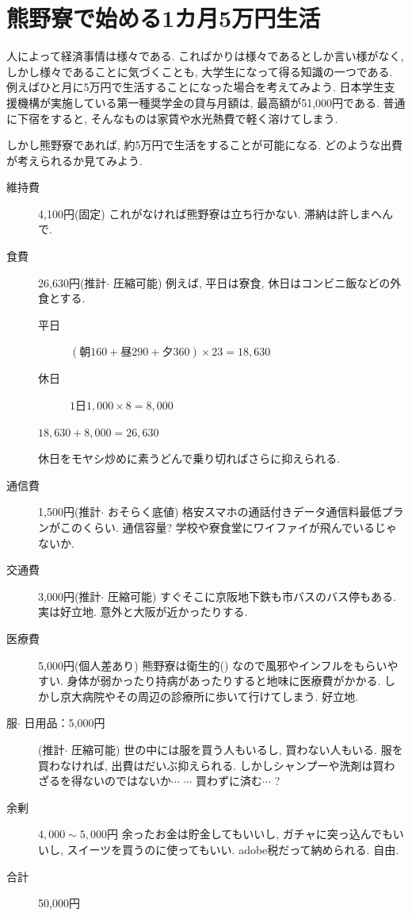 \documentclass[10pt,b5jsbook,dvips,dvipdfmx,openany]{jsbook}
\theoremstyle{definition}
\begin{document}




	\section{熊野寮で始める1カ月5万円生活}
	人によって経済事情は様々である. こればかりは様々であるとしか言い様がなく, しかし様々であることに気づくことも, 大学生になって得る知識の一つである. 例えばひと月に5万円で生活することになった場合を考えてみよう. 日本学生支援機構が実施している第一種奨学金の貸与月額は, 最高額が51,000円である. 普通に下宿をすると, そんなものは家賃や水光熱費で軽く溶けてしまう.

	しかし熊野寮であれば, 約5万円で生活をすることが可能になる. どのような出費が考えられるか見てみよう.
	\begin{description}
	\item[維持費] 4,100円(固定)
	これがなければ熊野寮は立ち行かない. 滞納は許しまへんで.
	\item[食費] 26,630円(推計$ \cdot $ 圧縮可能)
	例えば, 平日は寮食, 休日はコンビニ飯などの外食とする.
		\begin{description}
		\item[平日]  $(朝160+昼290+夕360) \times 23=18,630 $
		\item[休日] $1日1,000 \times 8=8,000 $
		\end{description}
	$ 18,630 + 8,000 = 26,630 $

	休日をモヤシ炒めに素うどんで乗り切ればさらに抑えられる.
	\item[通信費] 1,500円(推計$ \cdot $ おそらく底値)
	格安スマホの通話付きデータ通信料最低プランがこのくらい.
	通信容量? 学校や寮食堂にワイファイが飛んでいるじゃないか.
	\item[交通費] 3,000円(推計$ \cdot $ 圧縮可能)
	すぐそこに京阪地下鉄も市バスのバス停もある. 実は好立地.
	意外と大阪が近かったりする.
	\item[医療費] 5,000円(個人差あり)
	熊野寮は衛生的() なので風邪やインフルをもらいやすい.
	身体が弱かったり持病があったりすると地味に医療費がかかる.
	しかし京大病院やその周辺の診療所に歩いて行けてしまう. 好立地.
	\item[服$ \cdot $ 日用品：5,000円](推計$ \cdot $ 圧縮可能)
	世の中には服を買う人もいるし, 買わない人もいる.
服を買わなければ, 出費はだいぶ抑えられる.
しかしシャンプーや洗剤は買わざるを得ないのではないか$ \cdots $ $ \cdots $ 買わずに済む$ \cdots $ ?
	\item[余剰] $ 4,000 \sim 5,000円 $
	余ったお金は貯金してもいいし, ガチャに突っ込んでもいいし, スイーツを買うのに使ってもいい. adobe税だって納められる. 自由.
	\item[合計] 50,000円
	\end{description}
\end{document}

